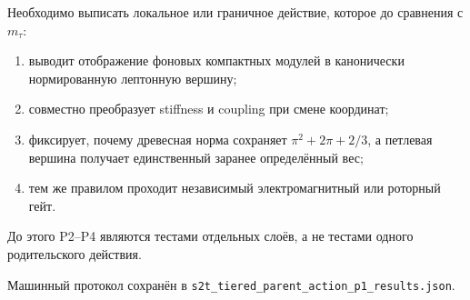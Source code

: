 \begin{protocol}
Необходимо выписать локальное или граничное действие, которое до сравнения
с \(m_\tau\):
\begin{enumerate}
 \item выводит отображение фоновых компактных модулей в канонически
 нормированную лептонную вершину;
 \item совместно преобразует stiffness и coupling при смене координат;
 \item фиксирует, почему древесная норма сохраняет
 \(\pi^2+2\pi+2/3\), а петлевая вершина получает единственный заранее
 определённый вес;
 \item тем же правилом проходит независимый электромагнитный или
 роторный гейт.
\end{enumerate}
До этого P2--P4 являются тестами отдельных слоёв, а не тестами одного
родительского действия.
\end{protocol}

Машинный протокол сохранён в
\texttt{s2t\_tiered\_parent\_action\_p1\_results.json}.